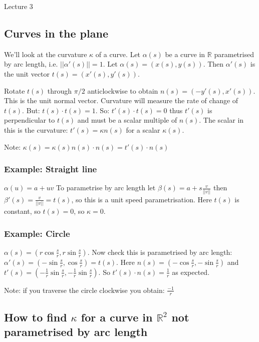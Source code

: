 \begin{center}

Lecture 3

\end{center}

\subsection{Curves in the plane}

We'll look at the curvature $\kappa$ of a curve. Let $\alpha(s)$ be a curve in $\mathbb{R}$ parametrised by arc length, i.e. $||\alpha'(s)|| = 1$. Let $\alpha(s) = (x(s), y(s))$. Then $\alpha'(s)$ is the unit vector $t(s) = (x'(s), y'(s))$.

Rotate $t(s)$ through $\pi/2$ anticlockwise to obtain $n(s) = (-y'(s), x'(s))$. This is the unit normal vector. Curvature will measure the rate of change of $t(s)$. But: $t(s) \cdot t(s) = 1$. So: $t'(s) \cdot t(s) = 0$ thus $t'(s)$ is perpendicular to $t(s)$ and must be a scalar multiple of $n(s)$. The scalar in this is the curvature: $t'(s) = \kappa n(s)$ for a scalar $\kappa(s)$.

Note: $\kappa(s) = \kappa(s) n(s) \cdot n(s) = t'(s) \cdot n(s)$

\subsubsection*{Example: Straight line}

$\alpha(u) = a + uv$ To parametrise by arc length let $\beta(s) = a + s \frac{v}{||v||}$ then $\beta'(s) = \frac{v}{||v||} = t(s)$, so this is a unit speed parametrisation. Here $t(s)$ is constant, so $t(s) = 0$, so $\kappa = 0$.

\subsubsection*{Example: Circle}

$\alpha(s) = (r \cos \frac{s}{r}, r \sin \frac{s}{r})$. Now check this is parametrised by arc length: $\alpha'(s) = (-\sin \frac{s}{r}, \cos \frac{s}{r}) = t(s)$. Here $n(s) = (-\cos \frac{s}{r}, - \sin \frac{s}{r})$ and $t'(s) = (- \frac{1}{r} \sin \frac{s}{r}, - \frac{1}{r} \sin \frac{s}{r})$. So $t'(s) \cdot n(s) = \frac{1}{r}$ as expected.

Note: if you traverse the circle clockwise you obtain: $\frac{-1}{r}$

\subsection{How to find $\kappa$ for a curve in $\mathbb{R}^2$ not parametrised by arc length}

